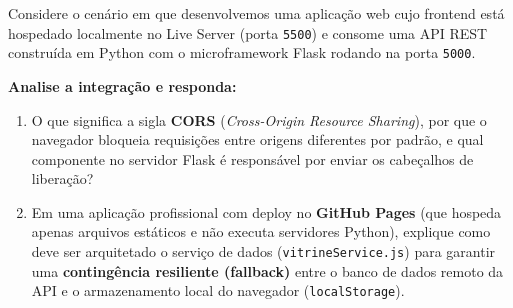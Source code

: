 \begin{tcolorbox}[colback=azulTitulo!4, colframe=azulTitulo, title=\textbf{Questão 3: Protocolo HTTP, Segurança de Rede (CORS) \& Arquitetura Híbrida [Valor: 1,5 ponto]}]
    Considere o cenário em que desenvolvemos uma aplicação web cujo frontend está hospedado localmente no Live Server (porta \texttt{5500}) e consome uma API REST construída em Python com o microframework Flask rodando na porta \texttt{5000}.

    \textbf{Analise a integração e responda:}
    \begin{enumerate}[label=\alph*)]
        \item O que significa a sigla \textbf{CORS} (\textit{Cross-Origin Resource Sharing}), por que o navegador bloqueia requisições entre origens diferentes por padrão, e qual componente no servidor Flask é responsável por enviar os cabeçalhos de liberação?
        \item Em uma aplicação profissional com deploy no \textbf{GitHub Pages} (que hospeda apenas arquivos estáticos e não executa servidores Python), explique como deve ser arquitetado o serviço de dados (\texttt{vitrineService.js}) para garantir uma \textbf{contingência resiliente (fallback)} entre o banco de dados remoto da API e o armazenamento local do navegador (\texttt{localStorage}).
    \end{enumerate}


\end{tcolorbox}
